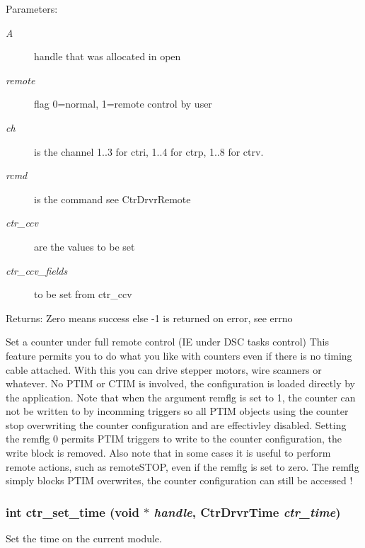 \begin{Desc}
\item[Parameters:]
\begin{description}
\item[{\em A}]handle that was allocated in open \item[{\em remote}]flag 0=normal, 1=remote control by user \item[{\em ch}]is the channel 1..3 for ctri, 1..4 for ctrp, 1..8 for ctrv. \item[{\em rcmd}]is the command see Ctr\-Drvr\-Remote \item[{\em ctr\_\-ccv}]are the values to be set \item[{\em ctr\_\-ccv\_\-fields}]to be set from ctr\_\-ccv \end{description}
\end{Desc}
\begin{Desc}
\item[Returns:]Zero means success else -1 is returned on error, see errno\end{Desc}
Set a counter under full remote control (IE under DSC tasks control) This feature permits you to do what you like with counters even if there is no timing cable attached. With this you can drive stepper motors, wire scanners or whatever. No PTIM or CTIM is involved, the configuration is loaded directly by the application. Note that when the argument remflg is set to 1, the counter can not be written to by incomming triggers so all PTIM objects using the counter stop overwriting the counter configuration and are effectivley disabled. Setting the remflg 0 permits PTIM triggers to write to the counter configuration, the write block is removed. Also note that in some cases it is useful to perform remote actions, such as remote\-STOP, even if the remflg is set to zero. The remflg simply blocks PTIM overwrites, the counter configuration can still be accessed ! 
\subsubsection{\setlength{\rightskip}{0pt plus 5cm}int ctr\_\-set\_\-time (void $\ast$ {\em handle}, Ctr\-Drvr\-Time {\em ctr\_\-time})}\label{libctr_8doxygen_234878b168fb6f8da712ef1f47d7f6d5}


Set the time on the current module. 

